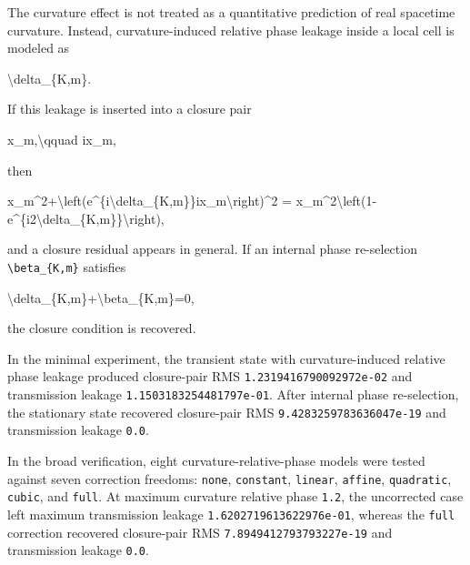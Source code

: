 \documentclass[
  a4paper,
]{article}
\newenvironment{Shaded}{}{}
\newcommand{\NormalTok}[1]{#1}
\newcounter{none} %
\begin{document}
The curvature effect is not treated as a quantitative prediction of real
spacetime curvature. Instead, curvature-induced relative phase leakage
inside a local cell is modeled as

\begin{Shaded}
\begin{Highlighting}[]
\NormalTok{\textbackslash{}delta\_\{K,m\}.}
\end{Highlighting}
\end{Shaded}

If this leakage is inserted into a closure pair

\begin{Shaded}
\begin{Highlighting}[]
\NormalTok{x\_m,\textbackslash{}qquad ix\_m,}
\end{Highlighting}
\end{Shaded}

then

\begin{Shaded}
\begin{Highlighting}[]
\NormalTok{x\_m\^{}2+\textbackslash{}left(e\^{}\{i\textbackslash{}delta\_\{K,m\}\}ix\_m\textbackslash{}right)\^{}2}
\NormalTok{=}
\NormalTok{x\_m\^{}2\textbackslash{}left(1{-}e\^{}\{i2\textbackslash{}delta\_\{K,m\}\}\textbackslash{}right),}
\end{Highlighting}
\end{Shaded}

and a closure residual appears in general. If an internal phase
re-selection \texttt{\textbackslash{}beta\_\{K,m\}} satisfies

\begin{Shaded}
\begin{Highlighting}[]
\NormalTok{\textbackslash{}delta\_\{K,m\}+\textbackslash{}beta\_\{K,m\}=0,}
\end{Highlighting}
\end{Shaded}

the closure condition is recovered.

In the minimal experiment, the transient state with curvature-induced
relative phase leakage produced closure-pair RMS
\texttt{1.2319416790092972e-02} and transmission leakage
\texttt{1.1503183254481797e-01}. After internal phase re-selection, the
stationary state recovered closure-pair RMS
\texttt{9.4283259783636047e-19} and transmission leakage \texttt{0.0}.

In the broad verification, eight curvature-relative-phase models were
tested against seven correction freedoms: \texttt{none},
\texttt{constant}, \texttt{linear}, \texttt{affine}, \texttt{quadratic},
\texttt{cubic}, and \texttt{full}. At maximum curvature relative phase
\texttt{1.2}, the uncorrected case left maximum transmission leakage
\texttt{1.6202719613622976e-01}, whereas the \texttt{full} correction
recovered closure-pair RMS \texttt{7.8949412793793227e-19} and
transmission leakage \texttt{0.0}.
\end{document}
